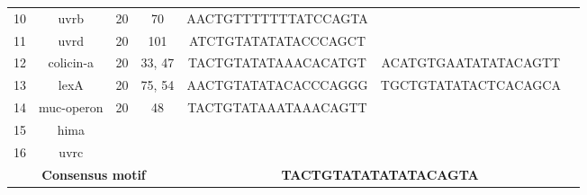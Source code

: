 \documentclass{article}
\begin{document}
\begin{table}
\begin{tabular}{|c|c|c|c|c|c|c|}
         10 &          uvrb &         20 &           70 &  AACTGTTTTTTTATCCAGTA &                       &                       \\
         11 &          uvrd &         20 &          101 &  ATCTGTATATATACCCAGCT &                       &                       \\
         12 &     colicin-a &         20 &       33, 47 &  TACTGTATATAAACACATGT &  ACATGTGAATATATACAGTT &                       \\
         13 &          lexA &         20 &       75, 54 &  AACTGTATATACACCCAGGG &  TGCTGTATATACTCACAGCA &                       \\
         14 &    muc-operon &         20 &           48 &  TACTGTATAAATAAACAGTT &                       &                       \\
         15 &          hima &            &              &                       &                       &                       \\
         16 &          uvrc &            &              &                       &                       &                       \\
\hline
   \multicolumn{4}{|c|}{\textbf{Consensus motif}}&     \multicolumn{3}{|c|}{\textbf{TACTGTATATATATACAGTA}}\\
\bottomrule
\end{tabular}
\end{table}
\end{document}
